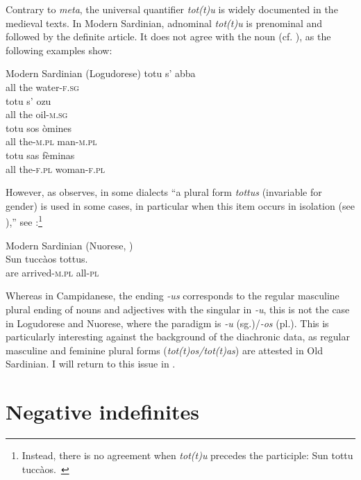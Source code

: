 \documentclass[output=paper,colorlinks,citecolor=brown]{langscibook}
\begin{document}
Contrary to \textit{meta}, the universal quantifier \textit{tot(t)u} is widely documented in the medieval texts. In Modern Sardinian, adnominal \textit{tot(t)u} is prenominal and followed by the definite article. It does not agree with the noun (cf. \cite[][37]{Jones1993}), as the following examples show:

\ea \label{ex:men2}
Modern Sardinian (Logudorese)
    \ea\label{men2a}
        \gll totu	s’	abba\\
         all	the	water-\textsc{f.sg} \\
    \ex\label{men2b}
        \gll totu	s’	ozu\\
         all	the	oil-\textsc{m.sg} \\
    \ex\label{men2c}
        \gll totu	sos	òmines\\
        all	the-\textsc{m.pl}	man-\textsc{m.pl} \\
    \ex\label{men2d}    
    \gll totu	sas	fèminas\\
        all	the-\textsc{f.pl}	woman-\textsc{f.pl}\\
    \z
\z

However, as \citet[][38]{Jones1993} observes, in some dialects “a plural form \textit{tottus} (invariable for gender) is used in some cases, in particular when this item occurs in isolation (see \citealt[270]{Farina1973}),” see :\footnote{Instead, there is no agreement when \textit{tot(t)u} precedes the participle:
\ea Sun tottu tuccàos.\  \citep[][38]{Jones1993}\z}

\ea\label{ex:men3}
    Modern Sardinian (Nuorese, \citealt[38]{Jones1993})\\
    \gll Sun tuccàos tottus.\\
     are	arrived-\textsc{m.pl} all-\textsc{pl}\\
\z

Whereas in Campidanese, the ending \textit{-us} corresponds to the regular masculine plural ending of nouns and adjectives with the singular in \textit{-u}, this is not the case in Logudorese and Nuorese, where the paradigm is \textit{-u} (sg.)/\textit{-os} (pl.). This is particularly interesting against the background of the diachronic data, as regular masculine and feminine plural forms  (\textit{tot(t)os/tot(t)as}) are attested in Old Sardinian. I will return to this issue in .


\section{Negative indefinites}\label{sec:men3}
\end{document}
